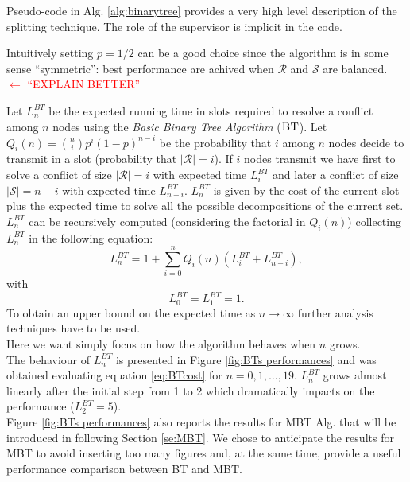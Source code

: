 \documentclass[12pt,a4paper]{report}
\newcommand{\rev}[1]{\textcolor{Cerulean}{#1}}
\newcommand{\algname}[1]{\ensuremath{\mbox{\sc #1}}}
\begin{document}
\rev{Pseudo-code in Alg. \ref{alg:binarytree} provides a very high level description of the splitting technique. The role of the supervisor is implicit in the code.\\}

\rev{Intuitively setting $p=1/2$ can be a good choice since the algorithm is in some sense ``symmetric'':  best performance are achived when $\mathcal{R}$ and $\mathcal{S}$ are balanced. \textcolor{red}{$\leftarrow$ ``EXPLAIN BETTER''}\\}


Let $L_{n}^{BT}$ be the expected running time in slots required to resolve a conflict among $n$ nodes using the \emph{Basic Binary Tree Algorithm} (\algname{BT}).
Let $Q_{i}(n)={n\choose i} p^{i} (1-p)^{n-i}$ be the probability that $i$ among $n$ nodes decide to transmit in a slot (probability that $|\mathcal{R}|=i$). If $i$ nodes transmit we have first to solve a conflict of size $|\mathcal{R}|=i$ with expected time $L_{i}^{BT}$ and later a conflict of size $|\mathcal{S}|=n-i$ with expected time $L_{n-i}^{BT}$. $L_{n}^{BT}$ is given by the cost of the current slot plus the expected time to solve all the possible decompositions of the current set.\\
$L_{n}^{BT}$ can be recursively computed (considering the factorial in $Q_{i}(n)$) collecting  $L_{n}^{BT}$ in the following equation:
\begin{equation}
\label{eq:BTcost}
L_{n}^{BT} = 1 + \sum_{i=0}^{n} Q_{i}(n) (L_{i}^{BT}+L_{n-i}^{BT}),
\end{equation}
with
\begin{equation*}
L_{0}^{BT} = L_{1}^{BT}  = 1.
\end{equation*}
To obtain an upper bound on the expected time as $ n \to \infty$ further analysis techniques have to be used.\\
Here we want simply focus on how the algorithm behaves when $n$ grows.\\

\rev{The behaviour of $L_{n}^{BT}$ is presented in Figure \ref{fig:BTs performances} and was obtained evaluating  equation \eqref{eq:BTcost} for $n=0,1,\ldots,19$. $L_{n}^{BT}$ grows almost linearly after the initial step from 1 to 2 which dramatically impacts on the performance ($L_{2}^{BT}=5$).\\ Figure \ref{fig:BTs performances} also reports the results for MBT Alg. that will be introduced in following Section \ref{se:MBT}. We chose to anticipate the results for MBT to avoid inserting too many figures and, at the same time, provide a useful performance comparison between BT and MBT.} 
\end{document}
